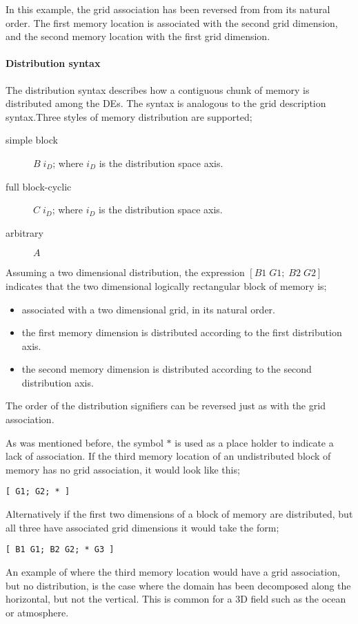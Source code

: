 In this example, the grid association has been reversed from from its natural order. 
The first memory location is associated with the second grid dimension, 
and the second memory location with the first grid dimension. 

\paragraph{Distribution syntax}
The distribution syntax describes how a contiguous chunk of memory is distributed among the DEs. 
The syntax is analogous to the grid description syntax.Three styles of memory distribution are supported;
\begin{description}
   \item[simple block] $B \; i_D$; where $i_D$ is the distribution space axis.
   \item[full block-cyclic] $C \; i_D$; where $i_D$ is the distribution space axis.  
   \item[arbitrary] $A$ 
\end{description}
Assuming a two dimensional distribution, the expression $[ B1 \; G1; \; B2 \; G2 ]$ indicates 
that the two dimensional logically rectangular block of memory is;
\begin{itemize}
	\item associated with a two dimensional grid, in its natural order.
	\item the first memory dimension is distributed according to the first distribution axis.
	\item the second memory dimension is distributed according to the second distribution axis.
\end{itemize}
The order of the distribution signifiers can be reversed just as with the grid association. 

As was mentioned before, the symbol $\ast$ is used as a place holder to indicate a lack of association. 
If the third memory location of an undistributed block of memory has no grid association, it would look like this;
\begin{center}
\begin{verbatim}
[ G1; G2; * ]
\end{verbatim}
\end{center}
Alternatively if the first two dimensions of a block of memory are distributed, 
but all three have associated grid dimensions it would take the form;
\begin{center}
\begin{verbatim}
[ B1 G1; B2 G2; * G3 ]
\end{verbatim}
\end{center}
An example of where the third memory location would have a grid association, but no distribution, 
is the case where the domain has been decomposed along the horizontal, but not the vertical. 
This is common for a 3D field such as the ocean or atmosphere. 

